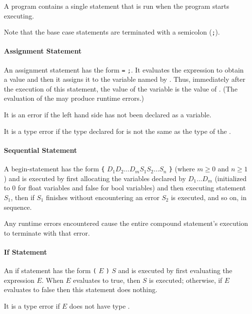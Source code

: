 \documentclass[11pt]{article}
\begin{document}
A program contains a single statement that is run when the program
starts executing.

Note that the base case statements are terminated with a semicolon
(\texttt{;}).

\paragraph{Assignment Statement}

An assignment statement has the form
 \texttt{=}  \texttt{;}.
It evaluates the expression  to obtain a value and then
it assigns it to the variable named by .
Thus, immediately after the execution of this statement, the value of
the variable  is the value of .
(The evaluation of the  may produce runtime errors.)

It is an error if the left hand side  has not been
declared as a variable.

It is a type error if the type declared for  is not the
same as the type of the .

\paragraph{Sequential Statement}

A begin-statement has the form
  \texttt{\{} $D_1 D_2 \ldots D_m S_1 S_2 \ldots S_n$ \texttt{\}}
(where $m \geq 0$ and $n \geq 1$)
and is executed by first allocating the variables declared
 by $D_1 \ldots D_m$ (initialized to $0$ for float variables and false
 for bool variables) and then executing statement $S_1$, then if $S_1$
finishes without encountering an error $S_2$ is executed, and
so on, in sequence.

Any runtime errors encountered cause the entire compound statement's
execution to terminate with that error.

\paragraph{If Statement}

An if statement has the form
   \texttt{(} $E$ \texttt{)} $S$
and is executed by first evaluating the expression $E$.
When $E$ evaluates to true, then $S$ is executed;
otherwise, if $E$ evaluates to false then this statement does nothing.

It is a type error if $E$ does not have type .
\end{document}

